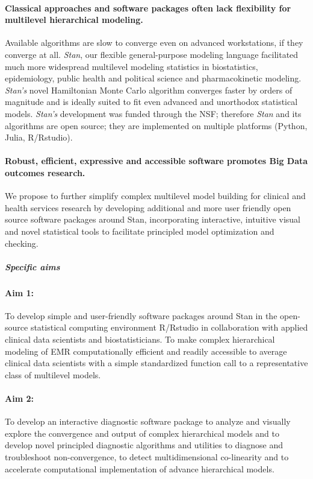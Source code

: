 \documentclass[11pt,notitlepage]{article}
\begin{document}
\paragraph*{Classical approaches and software packages often lack flexibility for multilevel hierarchical modeling.} Available algorithms are slow to converge even on advanced workstations, if they converge at all. \textit{Stan}, our flexible general-purpose modeling language facilitated much more widespread multilevel modeling statistics in biostatistics, epidemiology, public health and political science and pharmacokinetic modeling. \textit{Stan's} novel Hamiltonian Monte Carlo algorithm converges faster by orders of magnitude and is ideally suited to fit even advanced and unorthodox statistical models. \textit{Stan's} development was funded through the NSF; therefore \textit{Stan} and its algorithms are open source; they are implemented on multiple platforms (Python, Julia, R/Rstudio). 

\paragraph*{Robust, efficient, expressive and accessible software promotes Big Data outcomes research.} We propose to further simplify complex multilevel model building for clinical and health services research by developing additional and more user friendly open source software packages around Stan, incorporating interactive, intuitive visual and novel statistical tools to facilitate principled model optimization and checking. 

\subparagraph{Specific aims}
\paragraph*{Aim 1:} To develop simple and user-friendly software packages around Stan in the open-source statistical computing environment R/Rstudio in collaboration with applied clinical data scientists and biostatisticians. To make complex hierarchical modeling of EMR computationally efficient and readily accessible to average clinical data scientists with a simple standardized function call to a representative class of multilevel models.

\paragraph*{Aim 2:} To develop an interactive diagnostic software package to analyze and visually explore the convergence and output of complex hierarchical models and to develop novel principled diagnostic algorithms and utilities to diagnose and troubleshoot non-convergence, to detect multidimensional co-linearity and to accelerate computational implementation of advance hierarchical models.
\end{document}
